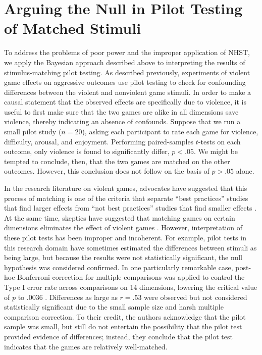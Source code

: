 \documentclass[man]{apa6}
\begin{document}
\section{Arguing the Null in Pilot Testing of Matched Stimuli}
To address the problems of poor power and the improper application of NHST, we apply the Bayesian approach described above to interpreting the results of stimulus-matching pilot testing.  As described previously, experiments of violent game effects on aggressive outcomes use pilot testing to check for confounding differences between the violent and nonviolent game stimuli. In order to make a causal statement that the observed effects are specifically due to violence, it is useful to first make sure that the two games are alike in all dimensions save violence, thereby indicating an absence of confounds. Suppose that we run a small pilot study ($n = 20$), asking each participant to rate each game for violence, difficulty, arousal, and enjoyment. Performing paired-samples $t$-tests on each outcome, only violence is found to significantly differ, $p < .05$. We might be tempted to conclude, then, that the two games are matched on the other outcomes. However, this conclusion does not follow on the basis of $p > .05$ alone.

In the research literature on violent games, advocates have suggested that this process of matching is one of the criteria that separate ``best practices'' studies that find larger effects from ``not best practices'' studies that find smaller effects \citep{Anderson:etal:2010}. At the same time, skeptics have suggested that matching games on certain dimensions eliminates the effect of violent games \citep{Adachi:Willoughby:2011}. However, interpretation of these pilot tests has been improper and incoherent. For example, pilot tests in this research domain have sometimes estimated the differences between stimuli as being large, but because the results were not statistically significant, the null hypothesis was considered confirmed. In one particularly remarkable case, post-hoc Bonferroni correction for multiple comparisons was applied to control the Type I error rate across comparisons on 14 dimensions, lowering the critical value of $p$ to .0036 \citep{Arriaga:etal:2008}. Differences as large as $r = .53$ were observed but not considered statistically significant due to the small sample size and harsh multiple comparison correction. To their credit, the authors acknowledge that the pilot sample was small, but still do not entertain the possibility that the pilot test provided evidence of differences; instead, they conclude that the pilot test indicates that the games are relatively well-matched.
\end{document}
